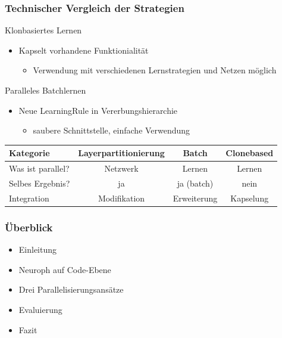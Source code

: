 \documentclass[18pt]{beamer}
\begin{document}
	\begin{frame}[c]\frametitle{Technischer Vergleich der Strategien}	

		\begin{block}{Klonbasiertes Lernen}
			\begin{itemize}
				\item Kapselt vorhandene Funktionialität
				\begin{itemize}
					\item Verwendung mit verschiedenen Lernstrategien und Netzen möglich
				\end{itemize}
			\end{itemize}	
		\end{block}

		\begin{block}{Paralleles Batchlernen}
			\begin{itemize}
				\item Neue LearningRule in Vererbungshierarchie
				\begin{itemize}
					\item saubere Schnittstelle, einfache Verwendung
				\end{itemize}
			\end{itemize}
		\end{block}
		\pause
		\vspace{0.8cm}
		\begin{tabular}{l|c|c|c|}

		Kategorie & Layerpartitionierung & Batch & Clonebased \\
		\hline
		Was ist parallel? & Netzwerk & Lernen & Lernen\\
		Selbes Ergebnis? & ja & ja (batch) & nein \\
		Integration & Modifikation & Erweiterung & Kapselung \\

		\end{tabular}
	
	\end{frame}
	
	\begin{frame}[c]\frametitle{Überblick}
		\begin{itemize}
		   \item Einleitung \checkmark
		   \item Neuroph auf Code-Ebene \checkmark
		   \item Drei Parallelisierungsansätze \checkmark
		   \item Evaluierung
		   \item Fazit
		\end{itemize}
	\end{frame}
\end{document}
